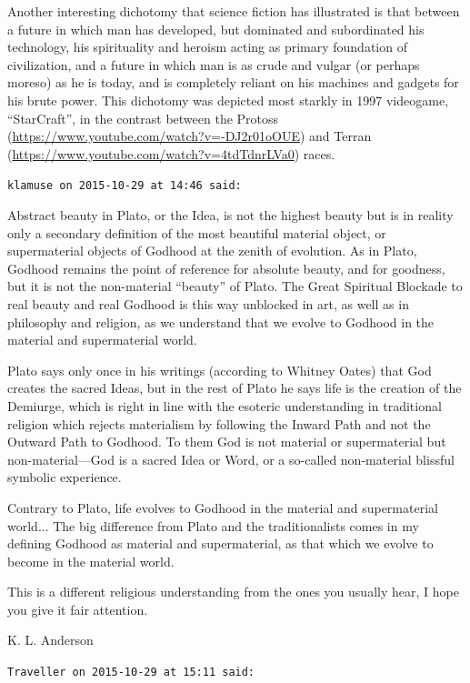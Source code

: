 \begin{footnotesize}
\begin{sffamily}
Another interesting dichotomy that science fiction has illustrated is that between a future in which man has developed, but dominated and subordinated his technology, his spirituality and heroism acting as primary foundation of civilization, and a future in which man is as crude and vulgar (or perhaps moreso) as he is today, and is completely reliant on his machines and gadgets for his brute power. This dichotomy was depicted most starkly in 1997 videogame, ``StarCraft'', in the contrast between the Protoss (\url{https://www.youtube.com/watch?v=-DJ2r01oOUE}) and Terran (\url{https://www.youtube.com/watch?v=4tdTdnrLVa0}) races.

\hfill

\texttt{klamuse on 2015-10-29 at 14:46 said:}

Abstract beauty in Plato, or the Idea, is not the highest beauty but is in reality only a secondary definition of the most beautiful material object, or supermaterial objects of Godhood at the zenith of evolution. As in Plato, Godhood remains the point of reference for absolute beauty, and for goodness, but it is not the non-material ``beauty'' of Plato. The Great Spiritual Blockade to real beauty and real Godhood is this way unblocked in art, as well as in philosophy and religion, as we understand that we evolve to Godhood in the material and supermaterial world.

Plato says only once in his writings (according to Whitney Oates) that God creates the sacred Ideas, but in the rest of Plato he says life is the creation of the Demiurge, which is right in line with the esoteric understanding in traditional religion which rejects materialism by following the Inward Path and not the Outward Path to Godhood. To them God is not material or supermaterial but non-material---God is a sacred Idea or Word, or a so-called non-material blissful symbolic experience.

Contrary to Plato, life evolves to Godhood in the material and supermaterial world... The big difference from Plato and the traditionalists comes in my defining Godhood as material and supermaterial, as that which we evolve to become in the material world.

This is a different religious understanding from the ones you usually hear, I hope you give it fair attention.

K. L. Anderson

\hfill

\texttt{Traveller on 2015-10-29 at 15:11 said:}


\end{sffamily}
\end{footnotesize}
